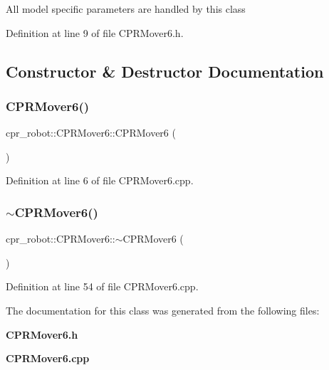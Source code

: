 All model specific parameters are handled by this class 

Definition at line 9 of file C\+P\+R\+Mover6.\+h.



\subsection{Constructor \& Destructor Documentation}
\mbox{\label{classcpr__robot_1_1CPRMover6_a884cfcd259229e56f5f7d93452cf576f}} 
\subsubsection{C\+P\+R\+Mover6()}
{\footnotesize\ttfamily cpr\+\_\+robot\+::\+C\+P\+R\+Mover6\+::\+C\+P\+R\+Mover6 (\begin{DoxyParamCaption}{ }\end{DoxyParamCaption})}



Definition at line 6 of file C\+P\+R\+Mover6.\+cpp.

\mbox{\label{classcpr__robot_1_1CPRMover6_a51997dede61107c24cd6946bab6efcdb}} 
\subsubsection{$\sim$\+C\+P\+R\+Mover6()}
{\footnotesize\ttfamily cpr\+\_\+robot\+::\+C\+P\+R\+Mover6\+::$\sim$\+C\+P\+R\+Mover6 (\begin{DoxyParamCaption}{ }\end{DoxyParamCaption})\hspace{0.3cm}{\ttfamily [virtual]}}



Definition at line 54 of file C\+P\+R\+Mover6.\+cpp.



The documentation for this class was generated from the following files\+:\begin{DoxyCompactItemize}
\item 
\textbf{ C\+P\+R\+Mover6.\+h}\item 
\textbf{ C\+P\+R\+Mover6.\+cpp}\end{DoxyCompactItemize}
